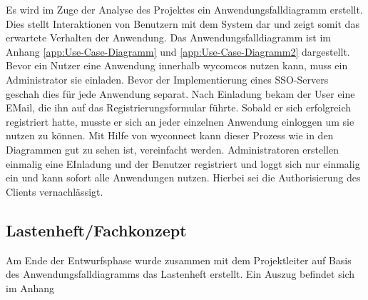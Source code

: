 Es wird im Zuge der Analyse des Projektes ein Anwendungsfalldiagramm erstellt. Dies stellt
Interaktionen von Benutzern mit dem System dar und zeigt somit das erwartete Verhalten der
Anwendung. Das Anwendungsfalldiagramm ist im Anhang \ref{app:Use-Case-Diagramm} und \ref{app:Use-Case-Diagramm2} dargestellt.
Bevor ein Nutzer eine Anwendung innerhalb wycomcos nutzen kann, muss ein Administrator sie einladen. Bevor der Implementierung eines \acs{SSO}-Servers geschah dies für jede Anwendung separat. Nach Einladung bekam der User eine EMail, die ihn auf das Registrierungsformular führte. Sobald er sich erfolgreich registriert hatte, musste er sich an jeder einzelnen Anwendung einloggen um sie nutzen zu können.
Mit Hilfe von wyconnect kann dieser Prozess wie in den Diagrammen gut zu sehen ist, vereinfacht werden. Administratoren erstellen einmalig eine EInladung und der Benutzer registriert und loggt sich nur einmalig ein und kann sofort alle Anwendungen nutzen.
Hierbei sei die Authorisierung des Clients vernachlässigt. 


\subsection{Lastenheft/Fachkonzept}
Am Ende der Entwurfsphase wurde zusammen mit dem Projektleiter auf Basis des Anwendungsfalldiagramms das Lastenheft erstellt. Ein Auszug befindet sich im Anhang 

